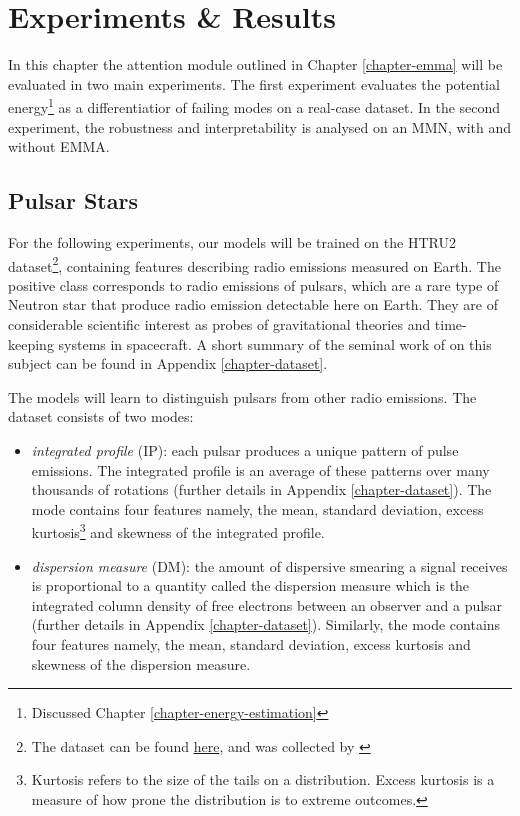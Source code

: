 \chapter{Experiments \& Results} 
\label{chapter-experiments} 

In this chapter the attention module outlined in Chapter \ref{chapter-emma} will be evaluated in two main experiments. The first experiment evaluates the potential energy\footnote{Discussed Chapter \ref{chapter-energy-estimation}} as a differentiatior of failing modes on a real-case dataset. In the second experiment, the robustness and interpretability is analysed on an MMN, with and without EMMA.



\section{Pulsar Stars}
For the following experiments, our models will be trained on the HTRU2 dataset\footnote{The dataset can be found \href{https://archive.ics.uci.edu/ml/datasets/HTRU2}{here}, and was collected by \citep{HTRU}}, containing features describing radio emissions measured on Earth. The positive class corresponds to radio emissions of pulsars, which are a rare type of Neutron star that produce radio emission detectable here on Earth. They are of considerable scientific interest as probes of gravitational theories and time-keeping systems in spacecraft. A short summary of the seminal work of \citep{lyon} on this subject can be found in Appendix \ref{chapter-dataset}. 

The models will learn to distinguish pulsars from other radio emissions. The dataset consists of two modes:
\begin{itemize}
\item \textit{integrated profile} (IP): each pulsar produces a unique pattern of pulse emissions. The integrated profile is an average of these patterns over many thousands of rotations (further details in Appendix \ref{chapter-dataset}). The mode contains four features namely, the mean, standard deviation, excess kurtosis\footnote{Kurtosis refers to the size of the tails on a distribution. Excess kurtosis is a measure of how prone the distribution is to extreme outcomes.} and skewness of the integrated profile.
\item \textit{dispersion measure} (DM): the amount of dispersive smearing a signal receives is proportional to a quantity called the dispersion measure which is the integrated column density of free electrons between an observer and a pulsar (further details in Appendix \ref{chapter-dataset}). Similarly, the mode contains four features namely, the mean, standard deviation, excess kurtosis and skewness of the dispersion measure.
\end{itemize}

